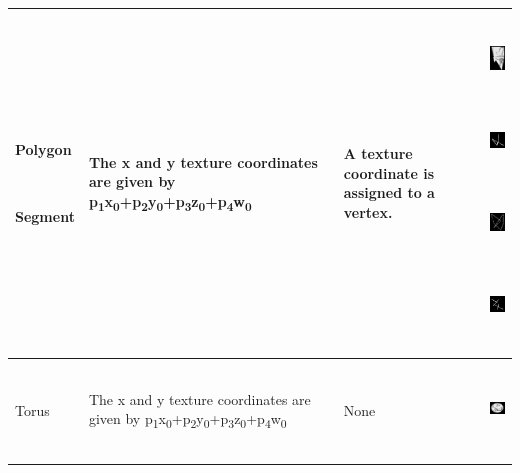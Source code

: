 \begin{center}
\begin{supertabular}{|m{0.7122598in}|m{3.22956in}|m{0.9816598in}|m{0.7559598in}|}
~

Polygon

~

Segment

~
 &
The x and y texture coordinates are given by
p\textsubscript{1}x\textsubscript{0}+p\textsubscript{2}y\textsubscript{0}+p\textsubscript{3}z\textsubscript{0}+p\textsubscript{4}w\textsubscript{0}
 &
A texture coordinate is assigned to a vertex.  &


\begin{center}
\includegraphics[width=0.6602in,height=0.6602in]{ub-img/ub-img27.jpg}
\end{center}
\begin{center}
\includegraphics[width=0.6602in,height=0.6602in]{ub-img/ub-img28.jpg}
\end{center}
\begin{center}
\includegraphics[width=0.6602in,height=0.6602in]{ub-img/ub-img29.jpg}
\end{center}
\begin{center}
\includegraphics[width=0.6602in,height=0.6602in]{ub-img/ub-img30.jpg}
\end{center}
\\\hline
Torus &
The x and y texture coordinates are given by
p\textsubscript{1}x\textsubscript{0}+p\textsubscript{2}y\textsubscript{0}+p\textsubscript{3}z\textsubscript{0}+p\textsubscript{4}w\textsubscript{0}
&
None &
\begin{center}
\includegraphics[width=0.6693in,height=0.698in]{ub-img/ub-img31.jpg}
\end{center}
\\\hline
\end{supertabular}
\end{center}

